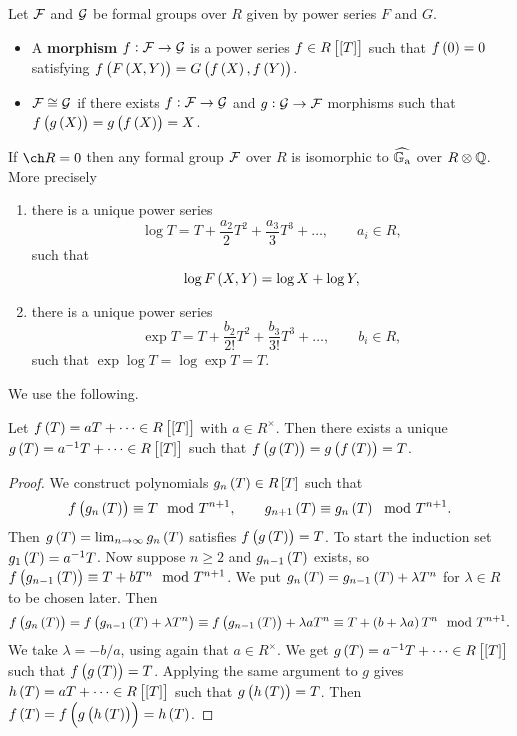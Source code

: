 \begin{definition*}
Let $ \mathcal{F} $ and $ \mathcal{G} $ be formal groups over $ R $ given by power series $ F $ and $ G $.
\begin{itemize}
\item A \textbf{morphism} $ f : \mathcal{F} \to \mathcal{G} $ is a power series $ f \in R\sbr{\sbr{T}} $ such that $ f\br{0} = 0 $ satisfying $ f\br{F\br{X, Y}} = G\br{f\br{X}, f\br{Y}} $.
\item $ \mathcal{F} \cong \mathcal{G} $ if there exists $ f : \mathcal{F} \to \mathcal{G} $ and $ g : \mathcal{G} \to \mathcal{F} $ morphisms such that $ f\br{g\br{X}} = g\br{f\br{X}} = X $.
\end{itemize}
\end{definition*}

\begin{theorem}
\label{thm:8.3}
If $ \ch R = 0 $ then any formal group $ \mathcal{F} $ over $ R $ is isomorphic to $ \widehat{\mathbb{G}_{\mathrm{a}}} $ over $ R \otimes \mathbb{Q} $. More precisely
\begin{enumerate}
\item there is a unique power series
$$ \log T = T + \dfrac{a_2}{2}T^2 + \dfrac{a_3}{3}T^3 + \dots, \qquad a_i \in R, $$
such that
\begin{equation}
\label{eq:11}
\log F\br{X, Y} = \log X + \log Y,
\end{equation}
\item there is a unique power series
$$ \exp T = T + \dfrac{b_2}{2!}T^2 + \dfrac{b_3}{3!}T^3 + \dots, \qquad b_i \in R, $$
such that $ \exp \log T = \log \exp T = T $.
\end{enumerate}
\end{theorem}


We use the following.

\begin{lemma}
\label{lem:8.4}
Let $ f\br{T} = aT + \dots \in R\sbr{\sbr{T}} $ with $ a \in R^\times $. Then there exists a unique $ g\br{T} = a^{-1}T + \dots \in R\sbr{\sbr{T}} $ such that $ f\br{g\br{T}} = g\br{f\br{T}} = T $.
\end{lemma}

\begin{proof}
We construct polynomials $ g_n\br{T} \in R\sbr{T} $ such that
$$ f\br{g_n\br{T}} \equiv T \mod T^{n + 1}, \qquad g_{n + 1}\br{T} \equiv g_n\br{T} \mod T^{n + 1}. $$
Then $ g\br{T} = \lim_{n \to \infty} g_n\br{T} $ satisfies $ f\br{g\br{T}} = T $. To start the induction set $ g_1\br{T} = a^{-1}T $. Now suppose $ n \ge 2 $ and $ g_{n - 1}\br{T} $ exists, so $ f\br{g_{n - 1}\br{T}} \equiv T + bT^n \mod T^{n + 1} $. We put $ g_n\br{T} = g_{n - 1}\br{T} + \lambda T^n $ for $ \lambda \in R $ to be chosen later. Then
$$ f\br{g_n\br{T}} = f\br{g_{n - 1}\br{T} + \lambda T^n} \equiv f\br{g_{n - 1}\br{T}} + \lambda aT^n \equiv T + \br{b + \lambda a}T^n \mod T^{n + 1}. $$
We take $ \lambda = -b / a $, using again that $ a \in R^\times $. We get $ g\br{T} = a^{-1}T + \dots \in R\sbr{\sbr{T}} $ such that $ f\br{g\br{T}} = T $. Applying the same argument to $ g $ gives $ h\br{T} = aT + \dots \in R\sbr{\sbr{T}} $ such that $ g\br{h\br{T}} = T $. Then $ f\br{T} = f\br{g\br{h\br{T}}} = h\br{T} $.
\end{proof}

